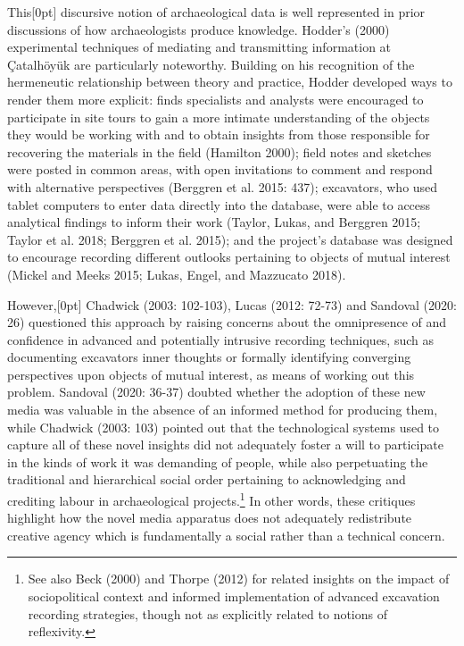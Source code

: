 \documentclass[
]{article}
\newcommand{\paragraphnumber}[1]{\marginnote{\color{lightgray}\tiny{#1}}[0pt]}
\begin{document}
This\paragraphnumber{[11]} discursive notion of archaeological data is
well represented in prior discussions of how archaeologists produce
knowledge. Hodder's (2000) experimental techniques of mediating and
transmitting information at Çatalhöyük are particularly noteworthy.
Building on his recognition of the hermeneutic relationship between
theory and practice, Hodder developed ways to render them more explicit:
finds specialists and analysts were encouraged to participate in site
tours to gain a more intimate understanding of the objects they would be
working with and to obtain insights from those responsible for
recovering the materials in the field (Hamilton 2000); field notes and
sketches were posted in common areas, with open invitations to comment
and respond with alternative perspectives (Berggren et al. 2015: 437);
excavators, who used tablet computers to enter data directly into the
database, were able to access analytical findings to inform their work
(Taylor, Lukas, and Berggren 2015; Taylor et al. 2018; Berggren et al.
2015); and the project's database was designed to encourage recording
different outlooks pertaining to objects of mutual interest (Mickel and
Meeks 2015; Lukas, Engel, and Mazzucato 2018).

However,\paragraphnumber{[12]} Chadwick (2003: 102-103), Lucas (2012:
72-73) and Sandoval (2020: 26) questioned this approach by raising
concerns about the omnipresence of and confidence in advanced and
potentially intrusive recording techniques, such as documenting
excavators inner thoughts or formally identifying converging
perspectives upon objects of mutual interest, as means of working out
this problem. Sandoval (2020: 36-37) doubted whether the adoption of
these new media was valuable in the absence of an informed method for
producing them, while Chadwick (2003: 103) pointed out that the
technological systems used to capture all of these novel insights did
not adequately foster a will to participate in the kinds of work it was
demanding of people, while also perpetuating the traditional and
hierarchical social order pertaining to acknowledging and crediting
labour in archaeological projects.\footnote{See also Beck (2000) and
  Thorpe (2012) for related insights on the impact of sociopolitical
  context and informed implementation of advanced excavation recording
  strategies, though not as explicitly related to notions of
  reflexivity.} In other words, these critiques highlight how the novel
media apparatus does not adequately redistribute creative agency which
is fundamentally a social rather than a technical concern.
\end{document}
